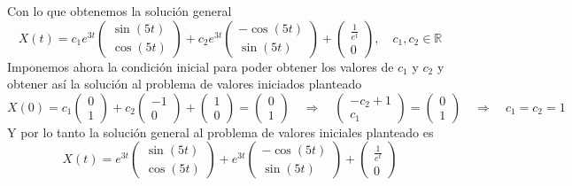 \documentclass[fleqn]{article}
\def\R{\mathds{R}}
\def\next{\quad \Rightarrow \quad}
\begin{document}
    Con lo que obtenemos la solución general
    $$
    X(t) = 
    c_1e^{3t}
    \begin{pmatrix}
        \sin(5t) \\
        \cos(5t)
    \end{pmatrix}
    +c_2e^{3t}
    \begin{pmatrix}
        -\cos(5t)\\
        \sin(5t)
    \end{pmatrix}
    +
    \begin{pmatrix}
        \frac{1}{e^{t}} \\ 0
    \end{pmatrix}
    , \quad c_1,c_2 \in \R
    $$
    Imponemos ahora la condición inicial para poder obtener los valores de $c_1$ y $c_2$ y obtener así la solución al problema de valores iniciados planteado
    $$X(0)=
    c_1
    \begin{pmatrix}
        0 \\ 1
    \end{pmatrix}
    + c_2
    \begin{pmatrix}
        -1 \\ 0
    \end{pmatrix}
    +
    \begin{pmatrix}
        1 \\ 0
    \end{pmatrix}
    =
    \begin{pmatrix}
        0 \\ 1
    \end{pmatrix}
    \next 
    \begin{pmatrix}
        -c_2 +1 \\ c_1
    \end{pmatrix}
    =
    \begin{pmatrix}
        0 \\ 1
    \end{pmatrix}
    \next c_1=c_2=1
    $$
    Y por lo tanto la solución general al problema de valores iniciales planteado es
    $$
    X(t) = 
    e^{3t}
    \begin{pmatrix}
        \sin(5t) \\
        \cos(5t)
    \end{pmatrix}
    +e^{3t}
    \begin{pmatrix}
        -\cos(5t)\\
        \sin(5t)
    \end{pmatrix}
    +
    \begin{pmatrix}
        \frac{1}{e^{t}} \\ 0
    \end{pmatrix}
    $$\\ \\
\end{document}
